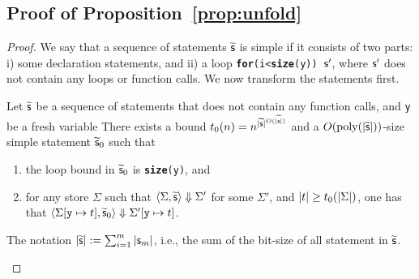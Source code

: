 \documentclass[runningheads]{llncs}
\begin{document}
\subsection{Proof of Proposition~\ref{prop:unfold}}
\label{app:proof_unfold}
\begin{proof}
We say that a sequence of statements $\widetilde{\mathsf{s}}$ is simple if it consists of two parts: i) some declaration statements, and ii) a loop \texttt{\textbf{for}(i<\textbf{size}(y)) $\mathsf{s}'$}, where $\mathsf{s}'$ does not contain any loops or function calls.
We now transform the statements first.

\begin{claim}
    Let $\widetilde{\mathsf{s}}$ be a sequence of statements that does not contain any function calls, and \texttt{y} be a fresh variable
    There exists a bound $t_0(n)=n^{\vert\widetilde{\mathsf{s}}\vert^{O(\vert\widetilde{\mathsf{s}}\vert)}}$ and a $O(\mathrm{poly}(\vert\widetilde{\mathsf{s}}\vert))$-size simple statement $\widetilde{\mathsf{s}}_0$ such that
    \begin{enumerate}
        \item the loop bound in $\widetilde{\mathsf{s}}_0$ is \texttt{\textbf{size}(y)}, and
        \item for any store $\Sigma$ such that $\langle\Sigma,\widetilde{\mathsf{s}}\rangle\Downarrow{\Sigma'}$ for some $\Sigma'$, and $|t|\ge t_0(\vert\Sigma\vert)$, one has that $\langle\Sigma[\texttt{y}\mapsto t],\widetilde{\mathsf{s}}_0\rangle\Downarrow{\Sigma'[\texttt{y}\mapsto t]}$.
    \end{enumerate}
    The notation $\vert\widetilde{\mathsf{s}}\vert:=\sum_{i=1}^m\vert\mathsf{s}_m\vert$, i.e., the sum of the bit-size of all statement in $\widetilde{\mathsf{s}}$.
\end{claim}


\end{proof}
\end{document}
